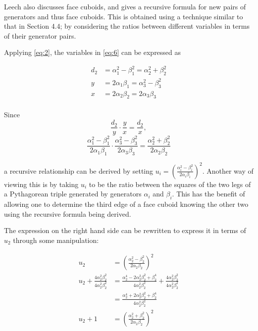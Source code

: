 \documentclass[11pt]{article}
\begin{document}
Leech also discusses face cuboids, and gives a recursive formula for new pairs of generators and thus face cuboids. This is obtained using a technique similar to that in Section 4.4; by considering the ratios between different variables in terms of their generator pairs.

Applying \eqref{eq:2}, the variables in \eqref{eq:6} can be expressed as

\begin{equation*}
\begin{aligned}
d_2&=\alpha_1^2-\beta_1^2=\alpha_2^2+\beta_2^2 \\
y&=2\alpha_1\beta_1=\alpha_3^2-\beta_3^2 \\
x&=2\alpha_2\beta_2=2\alpha_3\beta_3 \\
\end{aligned}
\end{equation*}

Since 
$$\frac{d_2}{y}\cdot\frac{y}{x}=\frac{d_2}{x},$$
\begin{equation}
\frac{\alpha_1^2-\beta_1^2}{2\alpha_1\beta_1}\cdot\frac{\alpha_3^2-\beta_3^2}{2\alpha_3\beta_3}=\frac{\alpha_2^2+\beta_2^2}{2\alpha_2\beta_2}
\label{eq:7}
\end{equation}

a recursive relationship can be derived by setting $u_i=\left(\frac{\alpha_i^2-\beta_i^2}{2\alpha_i\beta_i}\right)^2$. Another way of viewing this is by taking $u_i$ to be the ratio between the squares of the two legs of a Pythagorean triple generated by generators $\alpha_i$ and $\beta_i$. This has the benefit of allowing one to determine the third edge of a face cuboid knowing the other two using the recursive formula being derived.

The expression on the right hand side can be rewritten to express it in terms of $u_2$ through some manipulation:

\begin{equation*}
\begin{aligned}
u_2&=\left(\frac{\alpha_2^2-\beta_2^2}{2\alpha_2\beta_2}\right)^2 \\
u_2+\frac{4\alpha_2^2\beta_2^2}{4\alpha_2^2\beta_2^2}&=\frac{\alpha_2^4-2\alpha_2^2\beta_2^2+\beta_2^4}{4\alpha_2^2\beta_2^2}+\frac{4\alpha_2^2\beta_2^2}{4\alpha_2^2\beta_2^2} \\
&=\frac{\alpha_2^4+2\alpha_2^2\beta_2^2+\beta_2^4}{4\alpha_2^2\beta_2^2} \\
u_2+1&=\left(\frac{\alpha_2^2+\beta_2^2}{2\alpha_2\beta_2}\right)^2
\end{aligned}
\end{equation*}
\end{document}
